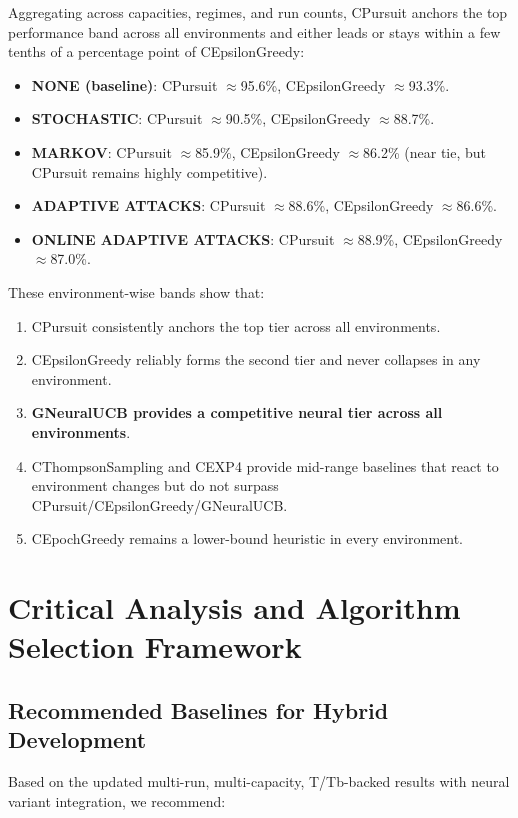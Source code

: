 \documentclass[12pt,a4paper]{article}
\newcommand{\neural}[1]{\textcolor{neuralcolor}{\textbf{#1}}}
\begin{document}
Aggregating across capacities, regimes, and run counts, CPursuit anchors the top performance band across all environments and either leads or stays within a few tenths of a percentage point of CEpsilonGreedy:

\begin{itemize}
\item \textbf{NONE (baseline)}: CPursuit $\approx$95.6\%, CEpsilonGreedy $\approx$93.3\%.
\item \textbf{STOCHASTIC}: CPursuit $\approx$90.5\%, CEpsilonGreedy $\approx$88.7\%.
\item \textbf{MARKOV}: CPursuit $\approx$85.9\%, CEpsilonGreedy $\approx$86.2\% (near tie, but CPursuit remains highly competitive).
\item \textbf{ADAPTIVE ATTACKS}: CPursuit $\approx$88.6\%, CEpsilonGreedy $\approx$86.6\%.
\item \textbf{ONLINE ADAPTIVE ATTACKS}: CPursuit $\approx$88.9\%, CEpsilonGreedy $\approx$87.0\%.
\end{itemize}

These environment-wise bands show that:

\begin{enumerate}
\item CPursuit consistently anchors the top tier across all environments.
\item CEpsilonGreedy reliably forms the second tier and never collapses in any environment.
\item \neural{GNeuralUCB provides a competitive neural tier across all environments}.
\item CThompsonSampling and CEXP4 provide mid-range baselines that react to environment changes but do not surpass CPursuit/CEpsilonGreedy/GNeuralUCB.
\item CEpochGreedy remains a lower-bound heuristic in every environment.
\end{enumerate}

\newpage
\section{Critical Analysis and Algorithm Selection Framework}

\subsection{Recommended Baselines for Hybrid Development}

Based on the updated multi-run, multi-capacity, T/Tb-backed results with neural variant integration, we recommend:
\end{document}
